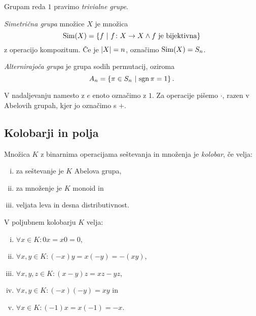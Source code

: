 \begin{definicija}
Grupam reda $1$ pravimo
\emph{trivialne grupe}.
\end{definicija}

\begin{definicija}
\emph{Simetrična grupa}
množice $X$ je množica
\[
\operatorname{Sim}(X)=\left\{f~\middle\vert~f\colon X\to X\land\text{$f$ je bijektivna}\right\}
\]
z operacijo kompozitum. Če je $\left\lvert X\right\rvert=n$, označimo $\operatorname{Sim}(X)=S_n$.

\emph{Alternirajoča grupa} je grupa
sodih permutacij, oziroma
\[
A_n = \left\{\pi \in S_n~\middle\vert~\operatorname{sgn} \pi = 1\right\}.
\]
\end{definicija}

\begin{opomba}
V nadaljevanju namesto z $e$ enoto označimo z $1$. Za operacije
pišemo $\cdot$, razen v Abelovih grupah, kjer jo označimo s $+$.
\end{opomba}

\newpage

\subsection{Kolobarji in polja}


\begin{definicija}
Množica $K$ z binarnima operacijama seštevanja in množenja je
\emph{kolobar}, če velja:

\begin{enumerate}[i)]
\item za seštevanje je $K$ Abelova grupa,
\item za množenje je $K$ monoid in
\item veljata leva in desna distributivnost.
\end{enumerate}
\end{definicija}

\begin{trditev}
V poljubnem kolobarju $K$ velja:

\begin{enumerate}[i)]
\item $\forall x \in K \colon 0x = x0 = 0$,
\item $\forall x, y \in K \colon (-x)y = x(-y) = -(xy)$,
\item $\forall x, y, z \in K \colon (x-y)z = xz - yz$,
\item $\forall x, y \in K \colon (-x)(-y) = xy$ in
\item $\forall x \in K \colon (-1)x = x(-1) = -x$.
\end{enumerate}
\end{trditev}

